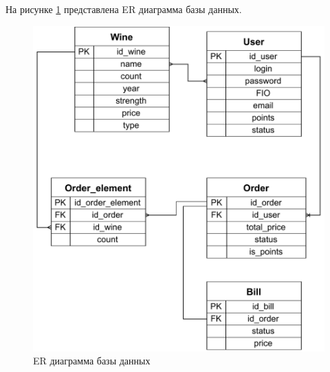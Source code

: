 На рисунке \ref{img:er-db} представлена ER диаграмма базы данных.
\begin{figure}[H]
	\centering
	\includegraphics[scale=0.8]{inc/img/er_db.pdf}
	\caption{ER диаграмма базы данных}
	\label{img:er-db}
\end{figure} 


